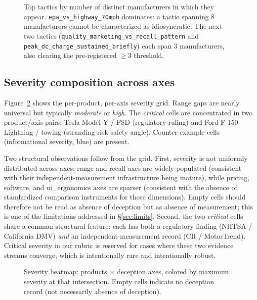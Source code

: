 \documentclass{article}
\begin{document}
\begin{figure}[!htbp]
\centering

\caption{Top tactics by number of distinct manufacturers in which they appear. \texttt{epa\_vs\_highway\_70mph} dominates: a tactic spanning 8 manufacturers cannot be characterized as idiosyncratic. The next two tactics (\texttt{quality\_marketing\_vs\_recall\_pattern} and \texttt{peak\_dc\_charge\_sustained\_briefly}) each span 3 manufacturers, also clearing the pre-registered $\geq 3$ threshold.}
\label{fig:tactic-prev}
\end{figure}

\subsection{Severity composition across axes}

Figure~\ref{fig:severity-heatmap} shows the per-product, per-axis severity grid. Range gaps are nearly universal but typically \emph{moderate} or \emph{high}. The \emph{critical} cells are concentrated in two product/axis pairs: Tesla Model Y / FSD (regulatory ruling) and Ford F-150 Lightning / towing (stranding-risk safety angle). Counter-example cells (informational severity, blue) are present.

Two structural observations follow from the grid. First, severity is not uniformly distributed across axes: range and recall axes are widely populated (consistent with their independent-measurement infrastructure being mature), while pricing, software, and ui\_ergonomics axes are sparser (consistent with the absence of standardized comparison instruments for those dimensions). Empty cells should therefore not be read as absence of deception but as absence of measurement; this is one of the limitations addressed in \S\ref{sec:limits}. Second, the two \emph{critical} cells share a common structural feature: each has both a regulatory finding (NHTSA / California DMV) \emph{and} an independent-measurement record (CR / MotorTrend). Critical severity in our rubric is reserved for cases where these two evidence streams converge, which is intentionally rare and intentionally robust.

\begin{figure}[!htbp]
\centering

\caption{Severity heatmap: products $\times$ deception axes, colored by maximum severity at that intersection. Empty cells indicate no deception record (not necessarily absence of deception).}
\label{fig:severity-heatmap}
\end{figure}
\FloatBarrier
\end{document}
